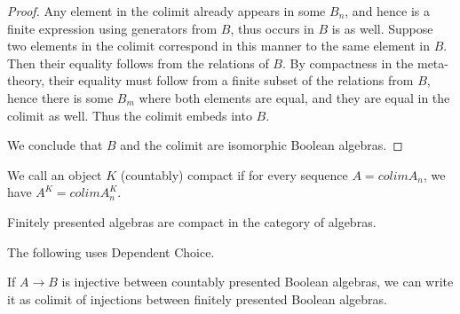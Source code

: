 \begin{proof}
  Any element in the colimit already appears in some $B_n$, and hence is 
  a finite expression using generators from $B$, thus occurs in $B$ is as well. 
  Suppose two elements in the colimit correspond in this manner to the same element in $B$. 
  Then their equality follows from the relations of $B$. 
  By compactness in the meta-theory, their equality must follow from a finite subset of the relations from $B$, 
  hence there is some $B_m$ where both elements are equal, and they are equal in the colimit as well. 
  Thus the colimit embeds into $B$. 

  We conclude that $B$ and the colimit are isomorphic Boolean algebras. 
\end{proof} 









\begin{definition}
  We call an object $K$ (countably) compact if for every sequence $A = colim A_n$, we have
  $A^K = colim A_n^K$.
\end{definition}

\begin{lemma}
  Finitely presented algebras are compact in the category of algebras. 
\end{lemma}  

 The following uses Dependent Choice.

\begin{lemma}
  If $A \to B$ is injective between countably presented Boolean algebras, 
  we can write it as colimit of injections between finitely presented Boolean algebras. 
\end{lemma}
